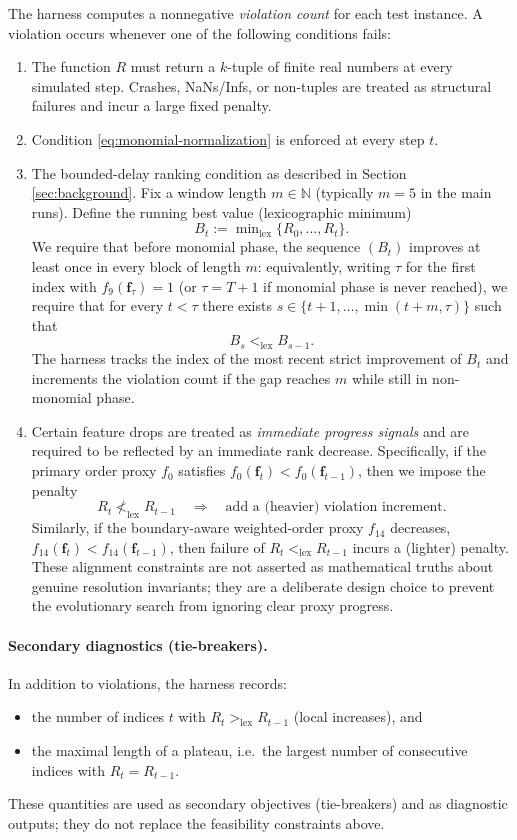 \documentclass[11pt]{amsart}
\begin{document}
The harness computes a nonnegative \emph{violation count} for each test instance. A violation occurs whenever one of the following conditions fails:
\begin{enumerate}[leftmargin=2em]
\item 
The function $R$ must return a $k$-tuple of finite real numbers at every simulated step.
Crashes, NaNs/Infs, or non-tuples are treated as structural failures and incur a large fixed penalty.

\item 
Condition \eqref{eq:monomial-normalization} is enforced at every step $t$.

\item The bounded-delay ranking condition as described in Section \ref{sec:background}. Fix a window length $m\in\mathbb{N}$ (typically $m=5$ in the main runs).
Define the running best value (lexicographic minimum)
\[
B_t := \min\nolimits_{\mathrm{lex}}\{R_0,\dots,R_t\}.
\]
We require that before monomial phase, the sequence $(B_t)$ improves at least once in every block of length $m$:
equivalently, writing $\tau$ for the first index with $f_9(\mathbf{f}_\tau)=1$ (or $\tau=T+1$ if monomial phase is never reached),
we require that for every $t<\tau$ there exists $s\in\{t+1,\dots,\min(t+m,\tau)\}$ such that
\[
B_s <_{\mathrm{lex}} B_{s-1}.
\]
The harness tracks the index of the most recent strict improvement of $B_t$ and increments the violation count if the
gap reaches $m$ while still in non-monomial phase. 

\item Certain feature drops are treated as \emph{immediate progress signals} and are required to be reflected by an immediate rank decrease.
Specifically, if the primary order proxy $f_0$ satisfies $f_0(\mathbf{f}_t)<f_0(\mathbf{f}_{t-1})$, then we impose the penalty
\[
R_t \not<_{\mathrm{lex}} R_{t-1} \quad\Longrightarrow\quad \text{add a (heavier) violation increment.}
\]
Similarly, if the boundary-aware weighted-order proxy $f_{14}$ decreases, $f_{14}(\mathbf{f}_t)<f_{14}(\mathbf{f}_{t-1})$, then
failure of $R_t<_{\mathrm{lex}}R_{t-1}$ incurs a (lighter) penalty.
These alignment constraints are not asserted as mathematical truths about genuine resolution invariants;
they are a deliberate design choice to prevent the evolutionary search from ignoring clear proxy progress.

\end{enumerate}

\paragraph{Secondary diagnostics (tie-breakers).}
In addition to violations, the harness records:
\begin{itemize}[leftmargin=2em]
\item the number of indices $t$ with $R_t>_{\mathrm{lex}}R_{t-1}$ (local increases), and
\item the maximal length of a plateau, i.e.\ the largest number of consecutive indices with $R_t=R_{t-1}$.
\end{itemize}
These quantities are used as secondary objectives (tie-breakers) and as diagnostic outputs; they do not replace the feasibility
constraints above.
\end{document}
